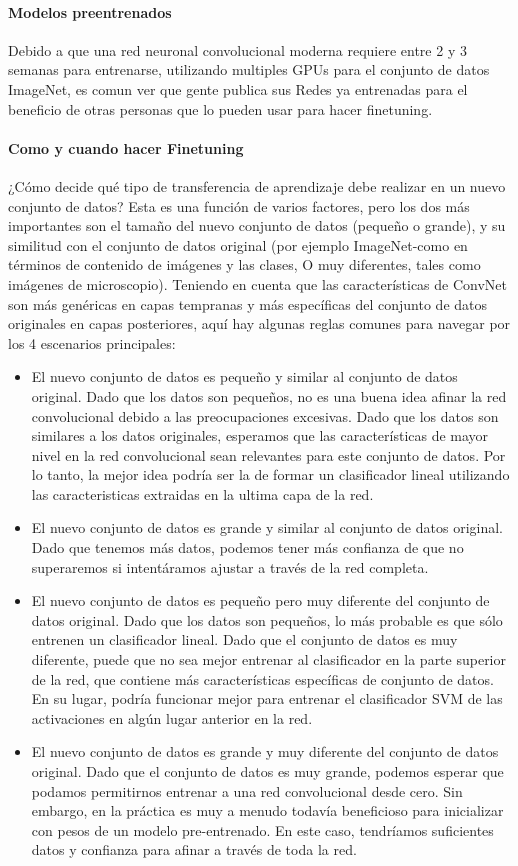 \documentclass[a4paper,10pt]{article}
\begin{document}
\paragraph{Modelos preentrenados}
Debido a que una red neuronal convolucional moderna requiere entre 2 y 3 semanas para entrenarse, utilizando multiples GPUs para el conjunto de datos ImageNet, es comun ver que gente
publica sus Redes ya entrenadas para el beneficio de otras personas que lo pueden usar para hacer finetuning.
\paragraph{Como y cuando hacer Finetuning}
 ¿Cómo decide qué tipo de transferencia de aprendizaje debe realizar en un nuevo conjunto de datos? Esta es una función de varios factores, pero los dos más importantes son el 
 tamaño del nuevo conjunto de datos (pequeño o grande), y su similitud con el conjunto de datos original (por ejemplo ImageNet-como en términos de contenido de imágenes y las clases,
 O muy diferentes, tales como imágenes de microscopio). Teniendo en cuenta que las características de ConvNet son más genéricas en capas tempranas y más específicas del conjunto de datos
 originales en capas posteriores, aquí hay algunas reglas comunes para navegar por los 4 escenarios principales:
\begin{itemize}
 \item El nuevo conjunto de datos es pequeño y similar al conjunto de datos original. Dado que los datos son pequeños, no es una buena idea afinar la red convolucional debido a las 
 preocupaciones excesivas. Dado que los datos son similares a los datos originales, esperamos que las características de mayor nivel en la red convolucional sean relevantes para este
 conjunto de datos. Por lo tanto, la mejor idea podría ser la de formar un clasificador lineal utilizando las caracteristicas extraidas en la ultima capa de la red.
 \item El nuevo conjunto de datos es grande y similar al conjunto de datos original. Dado que tenemos más datos, podemos tener más confianza de que no superaremos si intentáramos 
 ajustar a través de la red completa.
 \item El nuevo conjunto de datos es pequeño pero muy diferente del conjunto de datos original. Dado que los datos son pequeños, lo más probable es que sólo entrenen un clasificador 
 lineal. Dado que el conjunto de datos es muy diferente, puede que no sea mejor entrenar al clasificador en la parte superior de la red, que contiene más características específicas
 de conjunto de datos. En su lugar, podría funcionar mejor para entrenar el clasificador SVM de las activaciones en algún lugar anterior en la red.
 \item El nuevo conjunto de datos es grande y muy diferente del conjunto de datos original. Dado que el conjunto de datos es muy grande, podemos esperar que podamos permitirnos 
 entrenar a una red convolucional desde cero. Sin embargo, en la práctica es muy a menudo todavía beneficioso para inicializar con pesos de un modelo pre-entrenado. 
 En este caso, tendríamos suficientes datos y confianza para afinar a través de toda la red.
\end{itemize}
\end{document}
